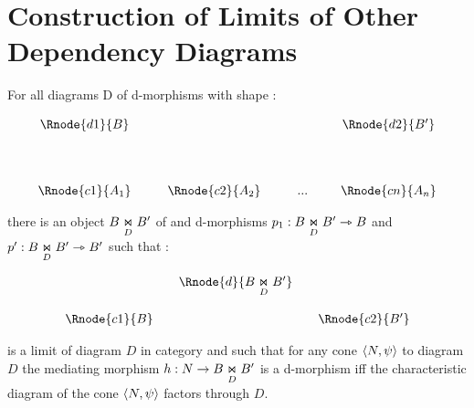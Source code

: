 \documentclass[10pt,a4paper]{scrartcl}
\begin{document}
\section{Construction of Limits of Other Dependency Diagrams}

\begin{lemma}
For all diagrams D of d-morphisms with shape \ndidly:
	
\begin{center}
\begin{displaymath}
\begin{array}{cp{0.3cm}c         p{0.3cm}  c p{0.2cm} c}
\Rnode{d1}{B}& &               & &     & &\Rnode{d2}{B'}  \\ [1.4cm]
\Rnode{c1}{A_1}& &\Rnode{c2}{A_2}& & ... & &\Rnode{cn}{A_n}
\end{array}
\end{displaymath}
\end{center}

there is an object  $ \fibrex{B}{B'}{D}$ of  and d-morphisms 
$p_1: \fibrex{B}{B'}{D} \smorph B$ and  $p': \fibrex{B}{B'}{D} \smorph B'$ such that :

\begin{center}
\begin{displaymath}
\begin{array}{cp{0cm}cp{0cm} c}
            & &\Rnode{d}{\fibrex{B}{B'}{D}}                  \\ [0.6cm]
\Rnode{c1}{B}& &                & & \Rnode{c2}{B'} 
\end{array}
\end{displaymath}
\end{center}

is a limit of diagram $D$ in category  and such that for any cone $\tuple{N,\psi}$ to diagram $D$
the mediating morphism $h: N \morph B \underset{D}{\Join} B'$ is a d-morphism iff 
the characteristic diagram of the cone $\tuple{N,\psi}$ factors through $D$.

\end{lemma}
\end{document}
